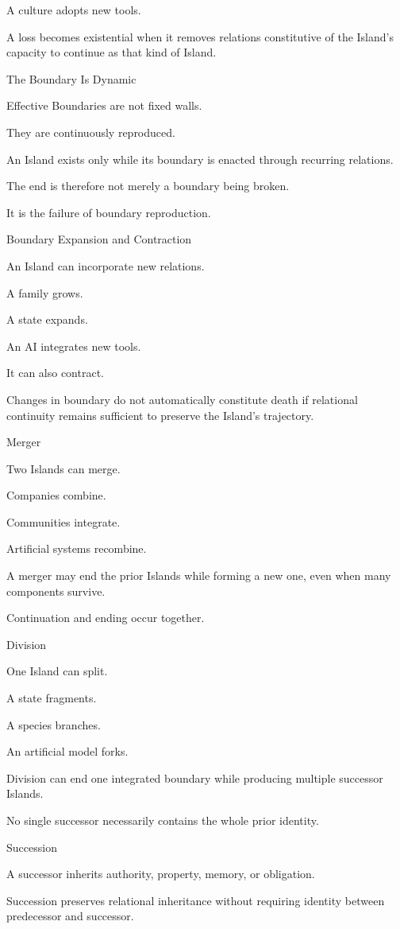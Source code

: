 A culture adopts new tools.

A loss becomes existential when it removes relations constitutive of the Island’s capacity to continue as that kind of Island.

The Boundary Is Dynamic

Effective Boundaries are not fixed walls.

They are continuously reproduced.

An Island exists only while its boundary is enacted through recurring relations.

The end is therefore not merely a boundary being broken.

It is the failure of boundary reproduction.

Boundary Expansion and Contraction

An Island can incorporate new relations.

A family grows.

A state expands.

An AI integrates new tools.

It can also contract.

Changes in boundary do not automatically constitute death if relational continuity remains sufficient to preserve the Island’s trajectory.

Merger

Two Islands can merge.

Companies combine.

Communities integrate.

Artificial systems recombine.

A merger may end the prior Islands while forming a new one, even when many components survive.

Continuation and ending occur together.

Division

One Island can split.

A state fragments.

A species branches.

An artificial model forks.

Division can end one integrated boundary while producing multiple successor Islands.

No single successor necessarily contains the whole prior identity.

Succession

A successor inherits authority, property, memory, or obligation.

Succession preserves relational inheritance without requiring identity between predecessor and successor.

